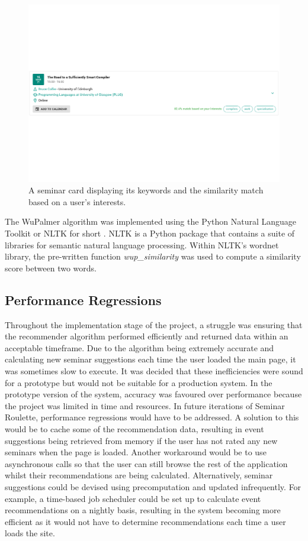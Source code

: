 \documentclass{l4proj}
\begin{document}
\begin{figure}[htb]
    \centering
    \includegraphics[width=0.8\linewidth]{images/seminar_card.pdf}    
    \caption{A seminar card displaying its keywords and the similarity match based on a user's interests.}
    \label{fig:seminar_card} 
\end{figure}

The WuPalmer algorithm was implemented using the Python Natural Language Toolkit or NLTK for short \citep{nltk}. NLTK is a Python package that contains a suite of libraries for semantic natural language processing. Within NLTK's wordnet library, the pre-written function \emph{wup\_similarity} was used to compute a similarity score between two words.

\subsection{Performance Regressions}
\label{section:performance_regressions}

Throughout the implementation stage of the project, a struggle was ensuring that the recommender algorithm performed efficiently and returned data within an acceptable timeframe. Due to the algorithm being extremely accurate and calculating new seminar suggestions each time the user loaded the main page, it was sometimes slow to execute. It was decided that these inefficiencies were sound for a prototype but would not be suitable for a production system. In the prototype version of the system, accuracy was favoured over performance because the project was limited in time and resources. In future iterations of Seminar Roulette, performance regressions would have to be addressed. A solution to this would be to cache some of the recommendation data, resulting in event suggestions being retrieved from memory if the user has not rated any new seminars when the page is loaded. Another workaround would be to use asynchronous calls so that the user can still browse the rest of the application whilst their recommendations are being calculated. Alternatively, seminar suggestions could be devised using precomputation and updated infrequently. For example, a time-based job scheduler could be set up to calculate event recommendations on a nightly basis, resulting in the system becoming more efficient as it would not have to determine recommendations each time a user loads the site.
\end{document}

